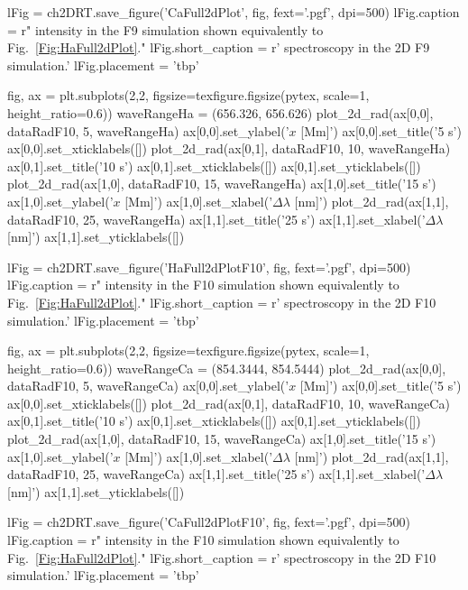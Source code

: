 \begin{pycode}[2DRT]
lFig = ch2DRT.save_figure('CaFull2dPlot', fig, fext='.pgf', dpi=500)
lFig.caption = r"\CaLine{} intensity in the F9 simulation shown equivalently to Fig.~\ref{Fig:HaFull2dPlot}."
lFig.short_caption = r'\CaLine{} spectroscopy in the 2D F9 simulation.'
lFig.placement = 'tbp'

fig, ax = plt.subplots(2,2, figsize=texfigure.figsize(pytex, scale=1, height_ratio=0.6))
waveRangeHa = (656.326, 656.626)
plot_2d_rad(ax[0,0], dataRadF10, 5, waveRangeHa)
ax[0,0].set_ylabel('$x$ [Mm]')
ax[0,0].set_title('5 s')
ax[0,0].set_xticklabels([])
plot_2d_rad(ax[0,1], dataRadF10, 10, waveRangeHa)
ax[0,1].set_title('10 s')
ax[0,1].set_xticklabels([])
ax[0,1].set_yticklabels([])
plot_2d_rad(ax[1,0], dataRadF10, 15, waveRangeHa)
ax[1,0].set_title('15 s')
ax[1,0].set_ylabel('$x$ [Mm]')
ax[1,0].set_xlabel('$\Delta\lambda$ [nm]')
plot_2d_rad(ax[1,1], dataRadF10, 25, waveRangeHa)
ax[1,1].set_title('25 s')
ax[1,1].set_xlabel('$\Delta\lambda$ [nm]')
ax[1,1].set_yticklabels([])

lFig = ch2DRT.save_figure('HaFull2dPlotF10', fig, fext='.pgf', dpi=500)
lFig.caption = r"\Ha{} intensity in the F10 simulation shown equivalently to Fig.~\ref{Fig:HaFull2dPlot}."
lFig.short_caption = r'\Ha{} spectroscopy in the 2D F10 simulation.'
lFig.placement = 'tbp'

fig, ax = plt.subplots(2,2, figsize=texfigure.figsize(pytex, scale=1, height_ratio=0.6))
waveRangeCa = (854.3444, 854.5444)
plot_2d_rad(ax[0,0], dataRadF10, 5, waveRangeCa)
ax[0,0].set_ylabel('$x$ [Mm]')
ax[0,0].set_title('5 s')
ax[0,0].set_xticklabels([])
plot_2d_rad(ax[0,1], dataRadF10, 10, waveRangeCa)
ax[0,1].set_title('10 s')
ax[0,1].set_xticklabels([])
ax[0,1].set_yticklabels([])
plot_2d_rad(ax[1,0], dataRadF10, 15, waveRangeCa)
ax[1,0].set_title('15 s')
ax[1,0].set_ylabel('$x$ [Mm]')
ax[1,0].set_xlabel('$\Delta\lambda$ [nm]')
plot_2d_rad(ax[1,1], dataRadF10, 25, waveRangeCa)
ax[1,1].set_title('25 s')
ax[1,1].set_xlabel('$\Delta\lambda$ [nm]')
ax[1,1].set_yticklabels([])

lFig = ch2DRT.save_figure('CaFull2dPlotF10', fig, fext='.pgf', dpi=500)
lFig.caption = r"\CaLine{} intensity in the F10 simulation shown equivalently to Fig.~\ref{Fig:HaFull2dPlot}."
lFig.short_caption = r'\CaLine{} spectroscopy in the 2D F10 simulation.'
lFig.placement = 'tbp'
\end{pycode}

